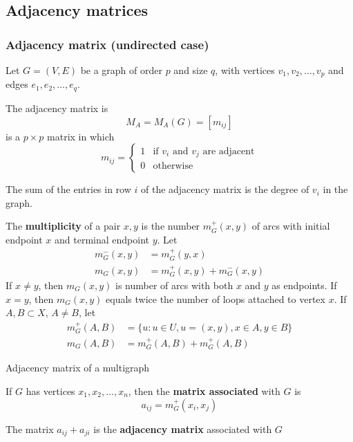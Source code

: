 \documentclass[aspectratio=169]{beamer}
\begin{document}
\subsection{Adjacency matrices}


\begin{frame}\frametitle{Adjacency matrix (undirected case)}
	Let $G=(V,E)$ be a graph of order $p$ and size $q$, with vertices $v_1, v_2, \dots , v_p$ and edges $e_1, e_2, \dots , e_q$.
	\begin{definition}
		The adjacency matrix is $$M_A=M_A(G)=[m_{ij}]$$ is a $p\times p$ matrix in which
		$$m_{ij}=\left \{ 
		\begin{array}{cc}
			1 & \textrm{if } v_i \textrm{ and } v_j \textrm{ are adjacent}\\
			0 & \textrm{otherwise}
		\end{array}
		\right .
		$$
	\end{definition}
\end{frame}

\begin{frame}
	\begin{theorem}
		The sum of the entries in row $i$ of the adjacency matrix is the degree of $v_i$ in the graph.
	\end{theorem}
\end{frame}

\begin{frame}
	\begin{definition}
		The \textbf{multiplicity} of a pair $x,y$ is the number $m_G^+(x,y)$ of arcs with initial endpoint $x$ and terminal endpoint $y$. Let
		\begin{align*}
			m_G^-(x,y) &= m_G^+(y,x) \\
			m_G(x,y) &= m_G^+(x,y)+m_G^-(x,y)
		\end{align*}
		If $x\neq y$, then $m_G(x,y)$ is number of arcs with both $x$ and $y$ as endpoints. If $x=y$, then $m_G(x,y)$ equals twice the number of loops attached to vertex $x$. If $A,B\subset X$, $A\neq B$, let
		\begin{align*}
			m_G^+(A,B) &= \{u:u\in U, u=(x,y),x\in A,y\in B\} \\
			m_G(A,B) &= m_G^+(A,B)+m_G^+(A,B)
		\end{align*}
	\end{definition}
\end{frame}

\begin{frame}{Adjacency matrix of a multigraph}
\begin{definition}
	If $G$ has vertices $x_1,x_2,\ldots,x_n$, then the \textbf{matrix associated} with $G$ is 
	\[
	a_{ij}=m_G^+(x_i,x_j)
	\]
\end{definition}
\vfill
\begin{definition}
	The matrix $a_{ij}+a_{ji}$ is the \textbf{adjacency matrix} associated with $G$
\end{definition}
\end{frame}
\end{document}
